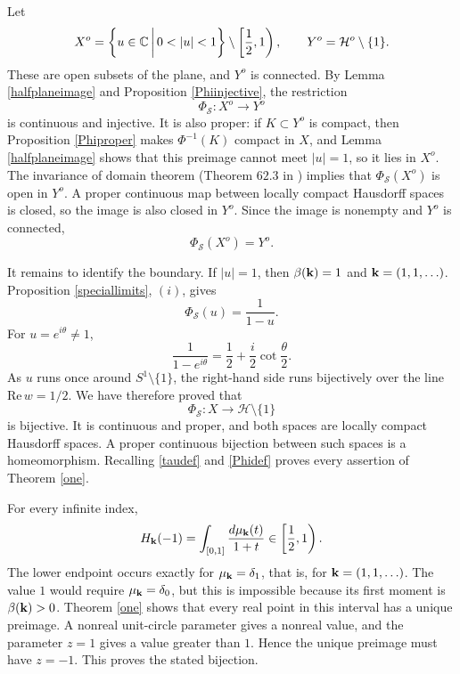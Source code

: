 \documentclass[12pt,a4paper]{amsart}
\makeatletter
\numberwithin{equation}{section}
\renewenvironment{proof}[1][Proof]{%
  \par\pushQED{\qed}%
  \normalfont\topsep6\p@\@plus6\p@\relax
  \trivlist
  \item[\hskip\labelsep\bfseries #1:]\ignorespaces
}{%
  \popQED\endtrivlist\@endpefalse
}
\theoremstyle{plain}
\theoremstyle{definition}
\makeatother
\begin{document}
\begin{proof}[Proof of Theorem \ref{one}]
Let
\[
X^{o}=\bigg{\{}u\in\mathbb{C}\,\bigg|\,0<|u|<1\bigg{\}}
\setminus\left[\frac12,1\right),
\qquad
Y^{o}=\mathcal{H}^{o}\setminus\{1\}.
\]
These are open subsets of the plane, and $Y^{o}$ is connected.  By Lemma \ref{halfplaneimage} and Proposition \ref{Phiinjective}, the restriction
\[
\Phi_{\mathcal{S}}:X^{o}\rightarrow Y^{o}
\]
is continuous and injective.  It is also proper: if $K\subset Y^{o}$ is compact, then Proposition \ref{Phiproper} makes $\Phi^{-1}(K)$ compact in $X$, and Lemma \ref{halfplaneimage} shows that this preimage cannot meet $|u|=1$, so it lies in $X^{o}$.  The invariance of domain theorem (Theorem $62.3$ in \cite{munkres}) implies that $\Phi_{\mathcal{S}}(X^{o})$ is open in $Y^{o}$.  A proper continuous map between locally compact Hausdorff spaces is closed, so the image is also closed in $Y^{o}$.  Since the image is nonempty and $Y^{o}$ is connected,
\[
\Phi_{\mathcal{S}}(X^{o})=Y^{o}.
\]

It remains to identify the boundary.  If $|u|=1$, then
$\beta({\bf k})=1$ and ${\bf k}=(1,1,\ldots)$.  Proposition \ref{speciallimits}, $(i)$, gives
\[
\Phi_{\mathcal{S}}(u)=\frac1{1-u}.
\]
For $u=e^{i\theta}\neq1$,
\begin{equation}\label{cotformula}
\frac1{1-e^{i\theta}}
=\frac12+\frac{i}{2}\cot\frac{\theta}{2}.
\end{equation}
As $u$ runs once around $S^1\setminus\{1\}$, the right-hand side runs bijectively over the line
$\mathrm{Re}\,w=1/2$.  We have therefore proved that
\[
\Phi_{\mathcal{S}}:X\rightarrow\mathcal{H}\setminus\{1\}
\]
is bijective.  It is continuous and proper, and both spaces are locally compact Hausdorff spaces.  A proper continuous bijection between such spaces is a homeomorphism.  Recalling \eqref{taudef} and \eqref{Phidef} proves every assertion of Theorem \ref{one}.
\end{proof}

\begin{proof}[Proof of Corollary \ref{minusone}]
For every infinite index,
\[
H_{\bf k}(-1)=\int_{[0,1]}\frac{d\mu_{\bf k}(t)}{1+t}
\in\left[\frac12,1\right).
\]
The lower endpoint occurs exactly for $\mu_{\bf k}=\delta_1$, that is, for ${\bf k}=(1,1,\ldots)$.  The value $1$ would require $\mu_{\bf k}=\delta_0$, but this is impossible because its first moment is $\beta({\bf k})>0$.  Theorem \ref{one} shows that every real point in this interval has a unique preimage.  A nonreal unit-circle parameter gives a nonreal value, and the parameter $z=1$ gives a value greater than $1$.  Hence the unique preimage must have $z=-1$.  This proves the stated bijection.
\end{proof}
\end{document}
